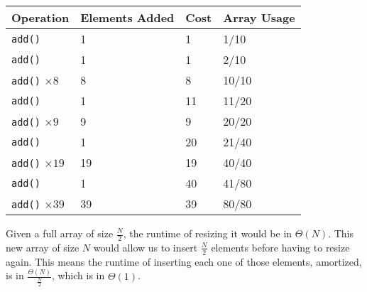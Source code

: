 \begin{blocksection}
\begin{parts}
\begin{solution}[2.5in]
\renewcommand{\arraystretch}{1.5}
\setlength{\tabcolsep}{16pt}
\begin{tabularx}{\textwidth}{Xlll}
Operation                     & Elements Added & Cost & Array Usage \\ \hline
\lstinline$add()$             & 1              & 1    & 1/10        \\
\lstinline$add()$             & 1              & 1    & 2/10        \\
\lstinline$add()$ $\times 8$  & 8              & 8    & 10/10       \\
\lstinline$add()$             & 1              & 11   & 11/20       \\
\lstinline$add()$ $\times 9$  & 9              & 9    & 20/20       \\
\lstinline$add()$             & 1              & 20   & 21/40       \\
\lstinline$add()$ $\times 19$ & 19             & 19   & 40/40       \\
\lstinline$add()$             & 1              & 40   & 41/80       \\
\lstinline$add()$ $\times 39$ & 39             & 39   & 80/80
\end{tabularx}

Given a full array of size $\frac{N}{2}$, the runtime of resizing it would be
in $\Theta(N)$. This new array of size $N$ would allow us to insert
$\frac{N}{2}$ elements before having to resize again. This means the runtime of
inserting each one of those elements, amortized, is in
$\frac{\Theta(N)}{\frac{N}{2}}$, which is in $\Theta(1)$.
\end{solution}
\end{parts}
\end{blocksection}

